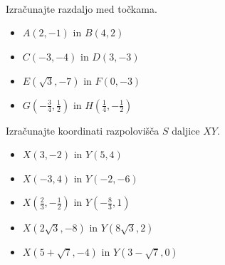                     
                    
        
    



    
        ~\\~\\~\\~\\~\\~\\~\\~
            

        \begin{naloga}
            Izračunajte razdaljo med točkama.
            \begin{itemize}
                \item $A(2,-1)$ in $B(4,2)$ 
                \item $C(-3,-4)$ in $D(3,-3)$ 
                \item $E(\sqrt{3},-7)$ in $F(0,-3)$ 
                \item $G(-\frac{3}{4},\frac{1}{2})$ in $H(\frac{1}{4},-\frac{1}{2})$ 
            \end{itemize}
        \end{naloga}

    \begin{naloga}
            Izračunajte koordinati razpolovišča $S$ daljice $XY$.
            \begin{itemize}
                \item $X(3,-2)$ in $Y(5,4)$ 
                \item $X(-3,4)$ in $Y(-2,-6)$ 
                \item $X(\frac{2}{3},-\frac{1}{2})$ in $Y(-\frac{8}{3},1)$ 
                \item $X(2\sqrt{3},-8)$ in $Y(8\sqrt{3},2)$ 
                \item $X(5+\sqrt{7},-4)$ in $Y(3-\sqrt{7},0)$ 
            \end{itemize}
        \end{naloga}

